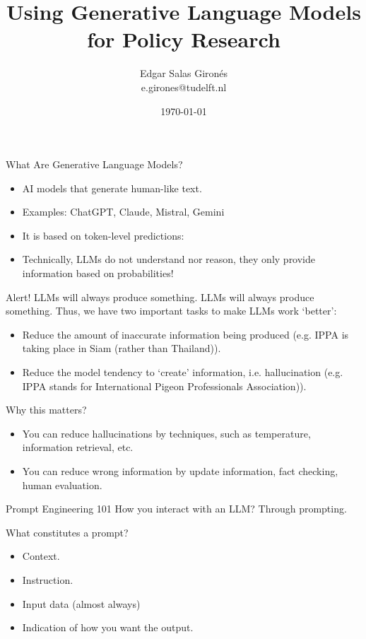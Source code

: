 \documentclass{beamer}
\title{Using Generative Language Models for Policy Research}
\author[E. Salas Gironés]{Edgar Salas Gironés \\ e.girones@tudelft.nl}
\date{\today}
\begin{document}
\begin{frame}
  \titlepage
\end{frame}

\begin{frame}{What Are Generative Language Models?}
\begin{itemize}
    \item AI models that generate human-like text.
    \item Examples: ChatGPT, Claude, Mistral, Gemini
    \item It is based on token-level predictions:
    \item Technically, LLMs do not understand nor reason, they only provide information based on probabilities!
\end{itemize}
\end{frame}

\begin{frame}{Alert! LLMs will always produce something.}
    LLMs will always produce something. Thus, we have two important tasks to make LLMs work `better':
    \begin{itemize}
        \item Reduce the amount of inaccurate information being produced (e.g. IPPA is taking place in Siam (rather than Thailand)).
        \item Reduce the model tendency to `create' information, i.e. hallucination (e.g. IPPA stands for International Pigeon Professionals Association)).
    \end{itemize}
\end{frame}

\begin{frame}{Why this matters?}
    \begin{itemize}
        \item You can reduce hallucinations by techniques, such as temperature, information retrieval, etc.
        \item You can reduce wrong information by update information, fact checking, human evaluation. 
    \end{itemize}
\end{frame}

\begin{frame}{Prompt Engineering 101}
    How you interact with an LLM? Through prompting. 

    \vspace{0.5cm}
    What constitutes a prompt?
    \begin{itemize}
        \item Context.
        \item Instruction.
        \item Input data (almost always)
        \item Indication of how you want the output.
    \end{itemize}
\end{frame}
\end{document}
